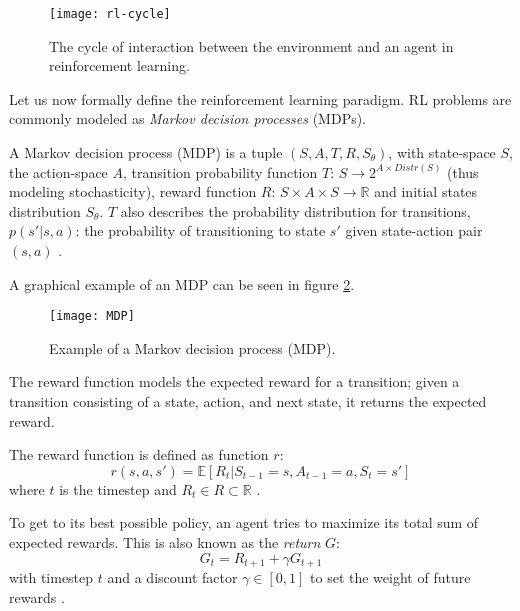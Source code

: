 \begin{figure}[h]
    \centering
    \texttt{[image: rl-cycle]}
    \caption{The cycle of interaction between the environment and an agent in reinforcement learning.}
    \label{fig:rl_cycle}
\end{figure}

Let us now formally define the reinforcement learning paradigm. RL problems are commonly modeled as \emph{Markov decision processes} (MDPs). 

\begin{definition} A Markov decision process (MDP) is a tuple $(S, A, T, R, S_{\theta})$, with state-space $S$, the action-space $A$, transition  probability function $T$: $S \rightarrow 2^{A \times Distr(S)}$ (thus modeling stochasticity), reward function $R$: $S \times A \times S \rightarrow \mathbb{R}$ and initial states distribution $S_{\theta}$. $T$ also describes the probability distribution for transitions, $p(s'|s,a)$: the probability of transitioning to state $s'$ given state-action pair $(s, a)$ \cite[p. 45-62]{grokking}.
\end{definition}

A graphical example of an MDP can be seen in figure \ref{fig:mdp}.

\begin{figure}[h]
    \centering
    \texttt{[image: MDP]}
    \caption{Example of a Markov decision process (MDP).}
    \label{fig:mdp}
\end{figure}

The reward function models the expected reward for a transition; given a transition consisting of a state, action, and next state, it returns the expected reward.

The reward function is defined as function $r$:
\begin{equation}
	\label{reward}
	r(s, a, s') = \mathds{E}[R_{t} | S_{t-1} = s, A_{t-1} = a, S_{t} = s']
\end{equation}
where $t$ is the timestep and $R_{t} \in R \subset \mathbb{R}$ \cite[p. 54]{grokking}.

To get to its best possible policy, an agent tries to maximize its total sum of expected rewards. This is also known as the \emph{return} $G$: 
\begin{equation}
G_t = R_{t+1} + \gamma G_{t+1}
\end{equation}
with timestep $t$ and a discount factor $\gamma \in [0,1]$ to set the weight of future rewards \cite[p. 67]{grokking}. 

